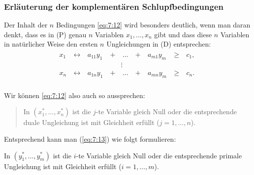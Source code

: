 \documentclass[smaller]{beamer}
\begin{document}
\begin{frame}
 \frametitle{Erläuterung der komplementären Schlupfbedingungen}
 Der Inhalt der $n$ Bedingungen \eqref{eq:7:12} wird besonders deutlich, wenn man daran denkt, dass es in (P) genau $n$ Variablen $x_1,\ldots,x_n$ gibt und dass diese $n$ Variablen in natürlicher Weise den ersten $n$ Ungleichungen in (D) entsprechen:
\begin{align*}
\begin{alignedat}{5}
x_1 &\ \longleftrightarrow &\ a_{11}y_1 &\ + &\ \ldots &\ + &\ a_{m1}y_m &\ \geq &\ c_1,\ \\
& & & & \vdots \ & & & & \\
x_n &\ \longleftrightarrow &\ a_{1n}y_1 &\ + &\ \ldots &\ + &\ a_{mn}y_m &\ \geq &\ c_n. \\
\end{alignedat}
\end{align*}

Wir können \eqref{eq:7:12} also auch so aussprechen:
\begin{quote}
\alert{In $(x_1^*,\ldots,x_n^*)$ ist die $j$-te Variable gleich Null oder die entsprechende duale Ungleichung ist mit Gleichheit erfüllt ($j=1,\ldots,n$).}
\end{quote}

Entsprechend kann man (\ref{eq:7:13}) wie folgt formulieren: \\\vspace*{0.2cm}

In $(y_1^*,\ldots,y_m^*)$ ist die $i$-te Variable gleich Null oder die entsprechende primale Ungleichung ist mit Gleichheit erfüllt ($i=1,\ldots,m$).
\end{frame}
\end{document}
